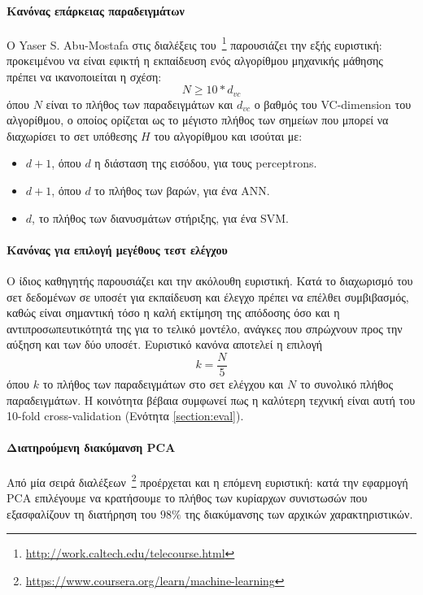 \paragraph{Κανόνας επάρκειας παραδειγμάτων} Ο Yaser S. Abu-Mostafa  στις διαλέξεις του~\footnote{\url{http://work.caltech.edu/telecourse.html}} παρουσιάζει την εξής ευριστική: προκειμένου να είναι εφικτή η εκπαίδευση ενός αλγορίθμου μηχανικής μάθησης πρέπει να ικανοποιείται η σχέση: 
\begin{equation}
N \geq  10 * d_{vc}
\end{equation}
όπου $N$ είναι το πλήθος των παραδειγμάτων και $d_{vc}$ ο βαθμός του VC-dimension του αλγορίθμου, ο οποίος ορίζεται ως το μέγιστο πλήθος των σημείων που μπορεί να διαχωρίσει το σετ υπόθεσης $H$ του αλγορίθμου και ισούται με:
\begin{itemize}
	\item $d+1$, όπου $d$ η διάσταση της εισόδου, για τους perceptrons.
	\item $d+1$, όπου $d$ το πλήθος των βαρών, για ένα \gls{ANN}.
	\item $d$, το πλήθος των διανυσμάτων στήριξης, για ένα \gls{SVM}.
\end{itemize}  


\paragraph{Κανόνας για επιλογή μεγέθους τεστ ελέγχου} Ο ίδιος καθηγητής παρουσιάζει και την ακόλουθη ευριστική. Κατά το διαχωρισμό του σετ δεδομένων σε υποσέτ για εκπαίδευση και έλεγχο πρέπει να επέλθει συμβιβασμός, καθώς είναι σημαντική τόσο η καλή εκτίμηση της απόδοσης όσο και η αντιπροσωπευτικότητά της για το τελικό μοντέλο, ανάγκες που σπρώχνουν προς την αύξηση και των δύο υποσέτ. Ευριστικό κανόνα αποτελεί η επιλογή 
\begin{equation}
k =  \frac{N}{5}
\end{equation}
όπου $k$ το πλήθος των παραδειγμάτων στο σετ ελέγχου και $N$ το συνολικό πλήθος παραδειγμάτων. Η κοινότητα βέβαια συμφωνεί πως η καλύτερη τεχνική είναι αυτή του 10-fold cross-validation (Ενότητα \ref{section:eval}). 

\paragraph{Διατηρούμενη διακύμανση \gls{PCA}} Από μία σειρά διαλέξεων~\footnote{\url{https://www.coursera.org/learn/machine-learning}} προέρχεται και η επόμενη ευριστική: κατά την εφαρμογή PCΑ επιλέγουμε να κρατήσουμε το πλήθος των κυρίαρχων συνιστωσών που εξασφαλίζουν τη διατήρηση του $98\%$ της διακύμανσης των αρχικών χαρακτηριστικών.

